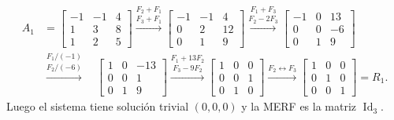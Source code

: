 \documentclass[12pt,reqno]{amsart}
\begin{document}
\begin{enumerate}
\begin{align*}
A_1 &= \left[\begin{array}{ccc}
 -1&-1&4\\
 1&3&8\\
 1&2&5\end{array}\right] \stackrel{F_2+F_1}{\stackrel{F_3+F_1}{\longrightarrow}}   
 \left[\begin{array}{ccc}
 -1&-1&4\\
 0&2&12\\
 0&1&9\end{array}\right]\stackrel{F_1+F_3}{\stackrel{F_2-2F_3}{\longrightarrow}}  
 \left[\begin{array}{ccc}
 -1&0&13\\
 0&0&-6\\
 0&1&9\end{array}\right]  \\
 &\stackrel{F_1/(-1)}{\stackrel{F_2/(-6)}{\longrightarrow}}  \quad
 \left[\begin{array}{ccc}
 1&0&-13\\
 0&0&1\\
 0&1&9\end{array}\right]\stackrel{F_1+13F_2}{\stackrel{F_3-9F_2}{\longrightarrow}}   
 \left[\begin{array}{ccc}
1&0&0\\
 0&0&1\\
 0&1&0\end{array}\right]{\stackrel{F_2 \leftrightarrow F_3}{\longrightarrow}}   
  \left[\begin{array}{ccc}
1&0&0\\
 0&1&0\\
 0&0&1\end{array}\right] =R_1.
\end{align*}
Luego el sistema tiene solución trivial $(0,0,0)$ y la MERF es la matriz $\operatorname{Id}_3$.


\end{enumerate}
\end{document}
